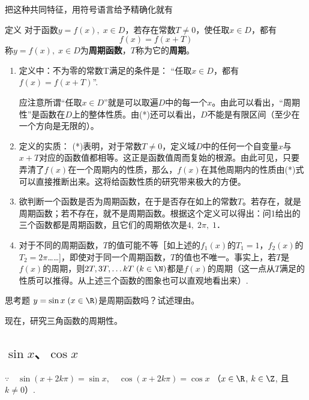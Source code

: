 把这种共同特征，用符号语言给予精确化就有

\begin{thm}
 {定义} 对于函数$y=f(x),\; x\in D$，若存在常数$T\ne 0$，使任取$x\in D$，都有
\begin{equation}
     f(x)=f(x+T)\tag{*}
\end{equation}
称$y=f(x),\; x\in D$为\textbf{周期函数}，$T$称为它的\textbf{周期}。   
\end{thm}

\begin{note}
\begin{enumerate}
    \item 定义中：不为零的常数T满足的条件是：
“任取$x\in D$，都有$f(x)=f(x+T)$”.

应注意所谓“任取$x\in D$”就是可以取遍$D$中的每一个$x$。由此可以看出，“周期性”是函数在$D$上的整体性质。由(*)还可以看出，$D$不能是有限区间（至少在一个方向是无限的）。
\item 定义的实质：
(*)表明，对于常数$T\ne 0$，定义域$D$中的任何一个自变量$x$与$x+T$对应的函数值都相等。这正是函数值周而复始的根源。由此可见，只要弄清了$f(x)$在一个周期内的性质，那么，$f(x)$在其他周期内的性质由(*)式可以直接推断出来。这将给函数性质的研究带来极大的方便。
\item 欲判断一个函数是否为周期函数，在于是否存在如上的常数$T$。若存在，就是周期函数；若不存在，就不是周期函数。根据这个定义可以得出：问1给出的三个函数都是周期函数，且它们的周期依次是$4,\; 2\pi,\;1$．
\item 对于不同的周期函数，$T$的值可能不等［如上述的$f_1(x)$的$T_1=1$，$f_2(x)$的$T_2=2\pi$……]，即使对于同一个周期函数，$T$的值也不唯一。事实上，若$T$是$f(x)$的周期，则$2T,3T,\ldots kT\; (k\in\N)$都是$f(x)$的周期（这一点从$T$满足的性质可以推得。从上述三个函数的图象也可以直观地看出来）.
\end{enumerate}
\end{note}

\begin{thm}
    {思考题}  $y=\sin x\; (x\in\R)$是周期函数吗？试述理由。
\end{thm}

现在，研究三角函数的周期性。

\subsection{$\sin x$、$\cos x$}

$\because\quad \sin ( x+ 2k\pi ) = \sin x, \quad \cos(x+2k\pi)=\cos x$ 
（$x\in \R$, \; $k\in \Z$, 且$k\neq 0$）.

